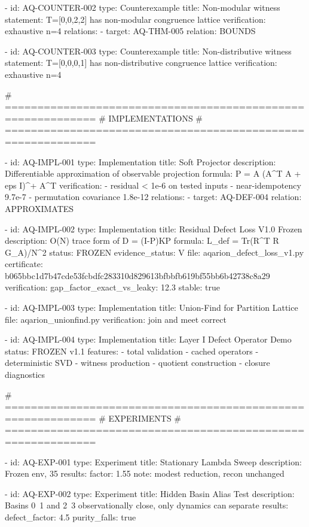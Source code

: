 {{{{{{{{{{{{{  - id: AQ-COUNTER-002
    type: Counterexample
    title: Non-modular witness
    statement: T=[0,0,2,2] has non-modular congruence lattice
    verification: exhaustive n=4
    relations:
      - target: AQ-THM-005
        relation: BOUNDS

  - id: AQ-COUNTER-003
    type: Counterexample
    title: Non-distributive witness
    statement: T=[0,0,0,1] has non-distributive congruence lattice
    verification: exhaustive n=4

  # ============================================================
  # IMPLEMENTATIONS
  # ============================================================

  - id: AQ-IMPL-001
    type: Implementation
    title: Soft Projector
    description: Differentiable approximation of observable projection
    formula: P = A (A^T A + eps I)^+ A^T
    verification:
      - residual < 1e-6 on tested inputs
      - near-idempotency 9.7e-7
      - permutation covariance 1.8e-12
    relations:
      - target: AQ-DEF-004
        relation: APPROXIMATES

  - id: AQ-IMPL-002
    type: Implementation
    title: Residual Defect Loss V1.0 Frozen
    description: O(N) trace form of D = (I-P)KP
    formula: L_def = Tr(R^T R G_A)/N^2
    status: FROZEN
    evidence_status: V
    file: aqarion_defect_loss_v1.py
    certificate: b065bbc1d7b47cde53fcbdfc283310d829613bfbbfb619bf55bb6b42738c8a29
    verification:
      gap_factor_exact_vs_leaky: 12.3
      stable: true

  - id: AQ-IMPL-003
    type: Implementation
    title: Union-Find for Partition Lattice
    file: aqarion_unionfind.py
    verification: join and meet correct

  - id: AQ-IMPL-004
    type: Implementation
    title: Layer I Defect Operator Demo
    status: FROZEN v1.1
    features:
      - total validation
      - cached operators
      - deterministic SVD
      - witness production
      - quotient construction
      - closure diagnostics

  # ============================================================
  # EXPERIMENTS
  # ============================================================

  - id: AQ-EXP-001
    type: Experiment
    title: Stationary Lambda Sweep
    description: Frozen env, 35%
    results:
      factor: 1.55
      note: modest reduction, recon unchanged

  - id: AQ-EXP-002
    type: Experiment
    title: Hidden Basin Alias Test
    description: Basins 0~1 and 2~3 observationally close, only dynamics can separate
    results:
      defect_factor: 4.5
      purity_falls: true

}}}}}}}}}}}}}
